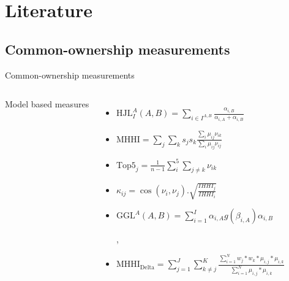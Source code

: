 \documentclass{beamer}
\begin{document}
	
	
	\section{Literature}
	

	
	\subsection{Common-ownership measurements}
	
	\normalsize
	
	\begin{frame}{Common-ownership measurements}\label{mainmeasure}
		\begin{columns}[t]
			\centering
			Model based measures
			\\
			
			\begin{itemize}
				\item \color{blue} \scriptsize $
				\text{HJL}_I^A(A,B) = \sum_{i\in I^{A,B}}\frac{\alpha_{i,B}}{\alpha_{i,A} + \alpha_{i,B}}     $  
				\normalcolor
				\tiny 
				
				\cite{harford2011institutional}
				
				
				\item \color{blue} \scriptsize$   \text{MHHI} = \sum_{j} \sum_k s_j s_k \frac{\sum_i \mu_{ij} \nu_{ik}}{\sum_i \mu_{ij} \nu_{ij}}   $ \tiny   \normalcolor
				
				\cite{azar2018anticompetitive}
				
				\item \color{blue} \scriptsize $   \text{Top5}_j = \frac{1}{n-1}\sum_i^5 \sum_{j\neq k} \nu_{ik}   $ \tiny \normalcolor 
			
			\cite{anton2020common} 
			
				\item \color{blue} \scriptsize $   \kappa_{ij} = \cos(\nu_i,\nu_j) . \sqrt{\frac{IHHI_j}{IHHI_i}}   $ \tiny \normalcolor 
			
			\cite{backus2020theory}
				
				\item \color{blue} \scriptsize$   \text{GGL}^A(A,B) = \sum_{i = 1}^{I} \alpha_{i,A}g(\beta_{i,A})\alpha_{i,B}   $ \tiny \normalcolor 
				
				\cite{gilje2020s} , \cite{Lewellen2021}
				
				
				\item \color{blue} \scriptsize $   \text{MHHI}_\text{Delta}= \sum_{j = 1}^{J} \sum_{k\neq j}^{K} \frac{\sum_{i = 1}^{N} w_j * w_k * \mu_{i,j} * \mu_{i,k}}{\sum_{i = 1}^{N}  \mu_{i,j} * \mu_{i,k} }  $ \tiny \normalcolor 
				

\end{itemize}
\end{columns}
\end{frame}
\end{document}
